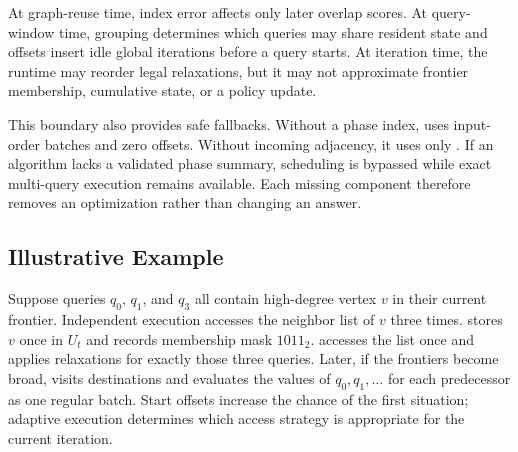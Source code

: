 At graph-reuse time, index error affects only later overlap scores.  At query-window time, grouping determines which queries may share resident state and offsets insert idle global iterations before a query starts.  At iteration time, the runtime may reorder legal relaxations, but it may not approximate frontier membership, cumulative state, or a policy update.

This boundary also provides safe fallbacks.  Without a phase index, \system uses input-order batches and zero offsets.  Without incoming adjacency, it uses only \sharedexpand.  If an algorithm lacks a validated phase summary, scheduling is bypassed while exact multi-query execution remains available.  Each missing component therefore removes an optimization rather than changing an answer.

\subsection{Illustrative Example}

Suppose queries $q_0$, $q_1$, and $q_3$ all contain high-degree vertex $v$ in their current frontier.  Independent execution accesses the neighbor list of $v$ three times.  \system stores $v$ once in $U_t$ and records membership mask $1011_2$.  \sharedexpand accesses the list once and applies relaxations for exactly those three queries.  Later, if the frontiers become broad, \coalescedgather visits destinations and evaluates the values of $q_0,q_1,\ldots$ for each predecessor as one regular batch.  Start offsets increase the chance of the first situation; adaptive execution determines which access strategy is appropriate for the current iteration.
